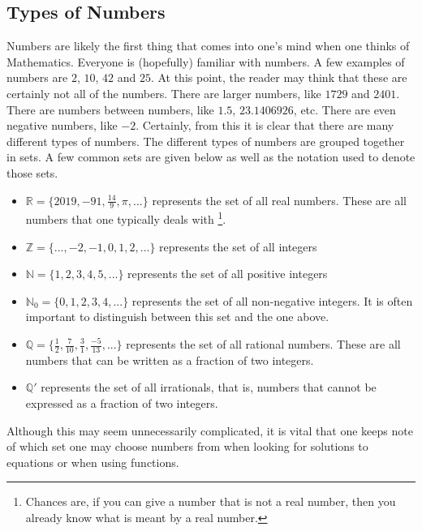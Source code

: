 \documentclass[a4paper,12pt]{article}
\begin{document}
\subsection{Types of Numbers}

Numbers are likely the first thing that comes into one's mind when one thinks of Mathematics. Everyone is (hopefully) familiar with numbers. A few examples of numbers are $2$, $10$, $42$ and $25$. At this point, the reader may think that these are certainly not all of the numbers. There are larger numbers, like $1729$ and $2401$. There are numbers between numbers, like $1.5$, $23.1406926$, etc. There are even negative numbers, like $-2$. Certainly, from this it is clear that there are many different types of numbers. The different types of numbers are grouped together in sets. A few common sets are given below as well as the notation used to denote those sets.

\begin{itemize}
\item $\mathbb{R} = \{2019, -91, \frac{14}{9}, \pi, ... \}$ represents the set of all real numbers. These are all numbers that one typically deals with \footnote{Chances are, if you can give a number that is not a real number, then you already know what is meant by a real number.}. 
\item $\mathbb{Z} = \{..., -2, -1, 0, 1, 2, ... \}$ represents the set of all integers
\item $\mathbb{N} = \{1, 2, 3, 4, 5, ... \}$ represents the set of all positive integers
\item $\mathbb{N}_0 = \{0, 1, 2, 3, 4, ... \}$ represents the set of all non-negative integers. It is often important to distinguish between this set and the one above.
\item $\mathbb{Q} = \{ \frac{1}{2}, \frac{7}{10}, \frac{3}{1}, \frac{-5}{13}, ... \}$ represents the set of all rational numbers. These are all numbers that can be written as a fraction of two integers.
\item $\mathbb{Q}'$ represents the set of all irrationals, that is, numbers that cannot be expressed as a fraction of two integers.
\end{itemize}

Although this may seem unnecessarily complicated, it is vital that one keeps note of which set one may choose numbers from when looking for solutions to equations or when using functions.
\end{document}

